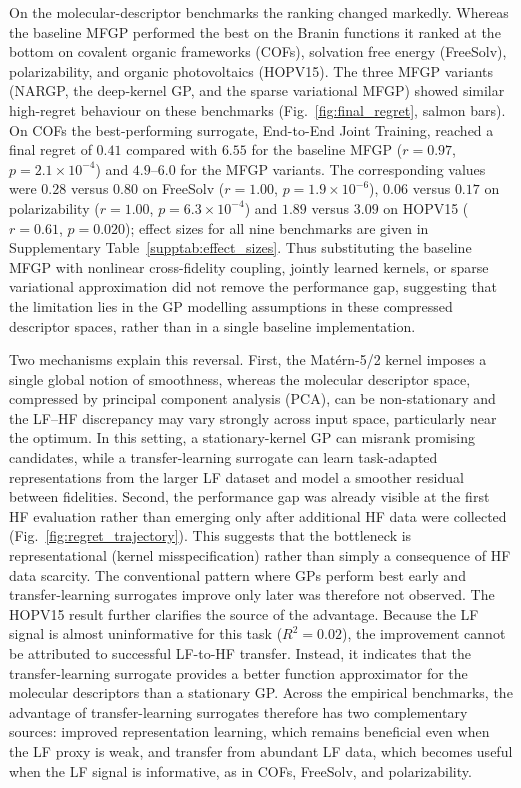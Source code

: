 \documentclass[11pt,a4paper]{article}%
\begin{document}
On the molecular-descriptor benchmarks the ranking changed markedly. Whereas the baseline MFGP performed the best on the Branin functions it ranked at the bottom on covalent organic frameworks (COFs), solvation free energy (FreeSolv),
polarizability, and organic photovoltaics (HOPV15). The three MFGP variants (NARGP, the deep-kernel GP, and the sparse
variational MFGP) showed similar
high-regret behaviour on these benchmarks (Fig.~\ref{fig:final_regret}, salmon bars). On COFs the best-performing surrogate,
End-to-End Joint Training, reached a final regret of $0.41$ compared with $6.55$ for the baseline MFGP
($r = 0.97$, $p = 2.1\times10^{-4}$) and $4.9$--$6.0$ for the MFGP variants. The
corresponding values were $0.28$ versus $0.80$ on FreeSolv ($r = 1.00$,
$p = 1.9\times10^{-6}$), $0.06$ versus $0.17$ on polarizability ($r = 1.00$,
$p = 6.3\times10^{-4}$) and $1.89$ versus $3.09$ on HOPV15 ($r = 0.61$, $p = 0.020$);
effect sizes for all nine benchmarks are given in Supplementary
Table~\ref{supptab:effect_sizes}. Thus substituting the baseline MFGP with
nonlinear cross-fidelity coupling, jointly learned kernels, or  sparse
variational approximation did not remove the performance gap, suggesting that the limitation lies in the
GP modelling assumptions in these compressed descriptor spaces, rather than in a  single baseline implementation.

Two mechanisms explain this reversal. First, the Mat\'{e}rn-5/2 kernel imposes a
single global notion of smoothness, whereas the molecular descriptor space, compressed by principal
component analysis (PCA), can be non-stationary and the LF--HF discrepancy may vary strongly across input space, particularly near the optimum. In this setting, a stationary-kernel GP can misrank promising candidates, while a transfer-learning surrogate can learn task-adapted representations from the larger
LF dataset and model a smoother residual between fidelities. Second, the performance gap
was already visible at the first HF evaluation rather than emerging only after additional HF data were collected
(Fig.~\ref{fig:regret_trajectory}). This suggests that the bottleneck is representational (kernel
misspecification) rather than simply a consequence of HF data scarcity.  The conventional pattern where GPs perform best early and transfer-learning
surrogates improve only later was therefore not observed. The HOPV15 result further clarifies the source of the advantage. Because the LF signal is almost uninformative for this task
($R^2 = 0.02$), the improvement cannot be attributed to successful LF-to-HF transfer. Instead, it indicates that the transfer-learning surrogate provides
a better function approximator for the molecular descriptors than a stationary GP. Across the empirical benchmarks, the advantage of transfer-learning surrogates therefore has two complementary sources: improved representation learning, which remains beneficial even when the LF proxy is weak, and
transfer from abundant LF data, which becomes useful when the LF signal is informative, as in
COFs, FreeSolv, and polarizability.
\end{document}
